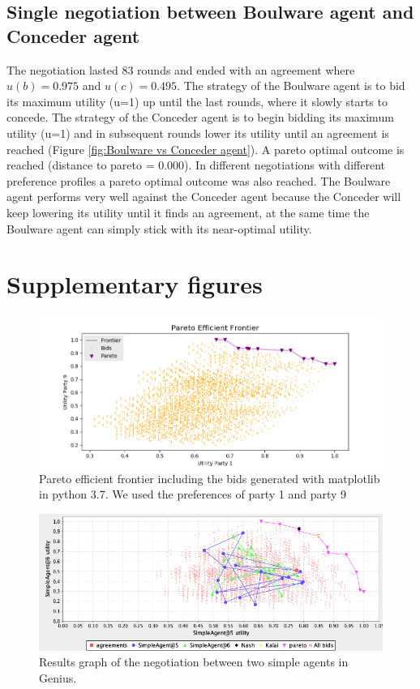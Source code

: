 \documentclass[a4paper]{article}
\begin{document}
\subsection{Single negotiation between Boulware agent and Conceder agent}
The negotiation lasted 83 rounds and ended with an agreement where $u(b) = 0.975$ and $u(c) = 0.495$. The strategy of the Boulware agent is to bid its maximum utility (u=1) up until the last rounds, where it slowly starts to concede. The strategy of the Conceder agent is to begin bidding its maximum utility (u=1) and in subsequent rounds lower its utility until an agreement is reached (Figure \ref{fig:Boulware vs Conceder agent}). A pareto optimal outcome is reached (distance to pareto = 0.000). In different negotiations with different preference profiles a pareto optimal outcome was also reached. The Boulware agent performs very well against the Conceder agent because the Conceder will keep lowering its utility until it finds an agreement, at the same time the Boulware agent can simply stick with its near-optimal utility. 
\newpage
\section{Supplementary figures}
\begin{figure}[h!]
\centering
\includegraphics[width=125mm]{pareto_efficient.png}
\caption{Pareto efficient frontier including the bids generated with matplotlib in python 3.7. We used the preferences of party 1 and party 9}
\label{fig:Pareto efficient figure}
\end{figure}

\begin{figure}[h!]
\centering
\includegraphics[width=125mm]{simplevssimple.png}
\caption{Results graph of the negotiation between two simple agents in Genius.}
\label{fig:Simple vs simple agents}
\end{figure}
\end{document}
